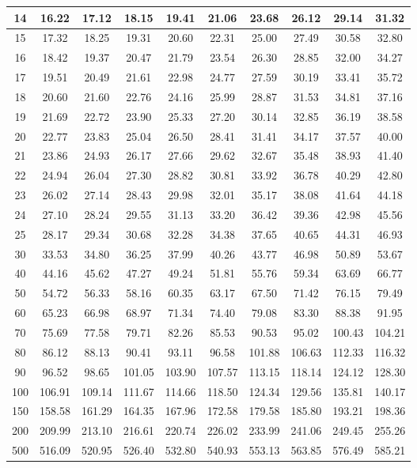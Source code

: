 \documentclass[11pt,a4paper]{article}
\begin{document}
\begin{table}[h]
\begin{tabular}{|c||c|c|c|c|c|c|c|c|c|}
		\hline		
		14 & 16.22 & 17.12 & 18.15 & 19.41 & 21.06 & 23.68 & 26.12 & 29.14 & 31.32\\
		\hline		
		15 & 17.32 & 18.25 & 19.31 & 20.60 & 22.31 & 25.00 & 27.49 & 30.58 & 32.80\\
		\hline		
		16 & 18.42 & 19.37 & 20.47 & 21.79 & 23.54 & 26.30 & 28.85 & 32.00 & 34.27\\
		\hline		
		17 & 19.51 & 20.49 & 21.61 & 22.98 & 24.77 & 27.59 & 30.19 & 33.41 & 35.72\\
		\hline		
		18 & 20.60 & 21.60 & 22.76 & 24.16 & 25.99 & 28.87 & 31.53 & 34.81 & 37.16\\
		\hline		
		19 & 21.69 & 22.72 & 23.90 & 25.33 & 27.20 & 30.14 & 32.85 & 36.19 & 38.58\\
		\hline		
		20 & 22.77 & 23.83 & 25.04 & 26.50 & 28.41 & 31.41 & 34.17 & 37.57 & 40.00\\
		\hline		
		21 & 23.86 & 24.93 & 26.17 & 27.66 & 29.62 & 32.67 & 35.48 & 38.93 & 41.40\\
		\hline		
		22 & 24.94 & 26.04 & 27.30 & 28.82 & 30.81 & 33.92 & 36.78 & 40.29 & 42.80\\
		\hline		
		23 & 26.02 & 27.14 & 28.43 & 29.98 & 32.01 & 35.17 & 38.08 & 41.64 & 44.18\\
		\hline		
		24 & 27.10 & 28.24 & 29.55 & 31.13 & 33.20 & 36.42 & 39.36 & 42.98 & 45.56\\
		\hline		
		25 & 28.17 & 29.34 & 30.68 & 32.28 & 34.38 & 37.65 & 40.65 & 44.31 & 46.93\\
		\hline		
		30 & 33.53 & 34.80 & 36.25 & 37.99 & 40.26 & 43.77 & 46.98 & 50.89 & 53.67\\
		\hline		
		40 & 44.16 & 45.62 & 47.27 & 49.24 & 51.81 & 55.76 & 59.34 & 63.69 & 66.77\\
		\hline		
		50 & 54.72 & 56.33 & 58.16 & 60.35 & 63.17 & 67.50 & 71.42 & 76.15 & 79.49\\
		\hline		
		60 & 65.23 & 66.98 & 68.97 & 71.34 & 74.40 & 79.08 & 83.30 & 88.38 & 91.95\\
		\hline		
		70 & 75.69 & 77.58 & 79.71 & 82.26 & 85.53 & 90.53 & 95.02 & 100.43 & 104.21\\
		\hline		
		80 & 86.12 & 88.13 & 90.41 & 93.11 & 96.58 & 101.88 & 106.63 & 112.33 & 116.32\\
		\hline		
		90 & 96.52 & 98.65 & 101.05 & 103.90 & 107.57 & 113.15 & 118.14 & 124.12 & 128.30\\
		\hline		
		100 & 106.91 & 109.14 & 111.67 & 114.66 & 118.50 & 124.34 & 129.56 & 135.81 & 140.17\\
		\hline		
		150 & 158.58 & 161.29 & 164.35 & 167.96 & 172.58 & 179.58 & 185.80 & 193.21 & 198.36\\
		\hline		
		200 & 209.99 & 213.10 & 216.61 & 220.74 & 226.02 & 233.99 & 241.06 & 249.45 & 255.26\\
		\hline		
		500 & 516.09 & 520.95 & 526.40 & 532.80 & 540.93 & 553.13 & 563.85 & 576.49 & 585.21\\
		\hline		
	\end{tabular}
\end{table}
\end{document}
